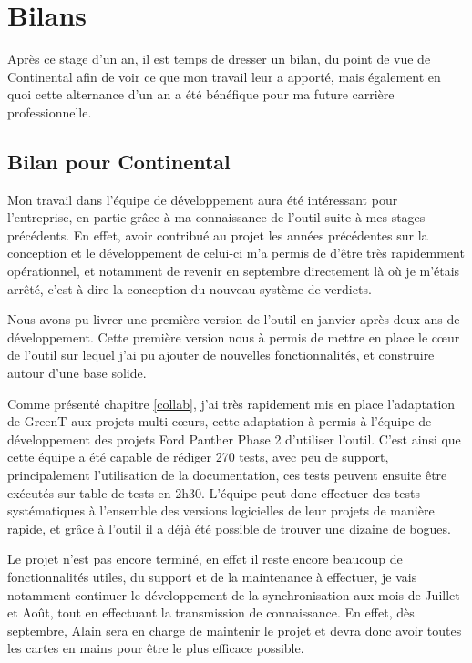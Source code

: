 \chapter{Bilans}
\putminitoc
%
Après ce stage d'un an, il est temps de dresser un bilan, du point de vue de Continental afin de voir ce que mon travail leur a apporté, mais également en quoi cette alternance d'un an a été bénéfique pour ma future carrière professionnelle.
%
\section{Bilan pour Continental}
Mon travail dans l'équipe de développement aura été intéressant pour l'entreprise, en partie grâce à ma connaissance de l'outil suite à mes stages précédents. En effet, avoir contribué au projet les années précédentes sur la conception et le développement de celui-ci m'a permis de d'être très rapidemment opérationnel, et notamment de revenir en septembre directement là où je m'étais arrêté, c'est-à-dire la conception du nouveau système de verdicts.

Nous avons pu livrer une première version de l'outil en janvier après deux ans de développement. Cette première version nous à permis de mettre en place le cœur de l'outil sur lequel j'ai pu ajouter de nouvelles fonctionnalités, et construire autour d'une base solide.

Comme présenté chapitre \ref{collab}, j'ai très rapidement mis en place l'adaptation de GreenT aux projets multi-c\oe{}urs, cette adaptation à permis à l'équipe de développement des projets Ford Panther Phase 2 d'utiliser l'outil. C'est ainsi que cette équipe a été capable de rédiger 270 tests, avec peu de support, principalement l'utilisation de la documentation, ces tests peuvent ensuite être exécutés sur table de tests en 2h30. L'équipe peut donc effectuer des tests systématiques à l'ensemble des versions logicielles de leur projets de manière rapide, et grâce à l'outil il a déjà été possible de trouver une dizaine de bogues.

Le projet n'est pas encore terminé, en effet il reste encore beaucoup de fonctionnalités utiles, du support et de la maintenance à effectuer, je vais notamment continuer le développement de la synchronisation aux mois de Juillet et Août, tout en effectuant la transmission de connaissance. En effet, dès septembre, Alain  sera en charge de maintenir le projet et devra donc avoir toutes les cartes en mains pour être le plus efficace possible.

